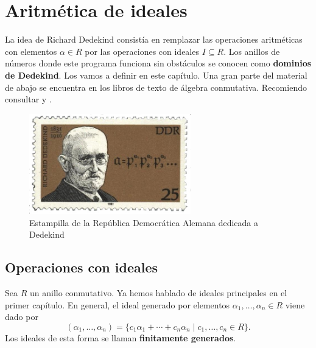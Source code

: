 \chapter{Aritmética de ideales}

La idea de Richard Dedekind consistía en remplazar las operaciones aritméticas
con elementos $\alpha \in R$ por las operaciones con ideales $I\subseteq R$.
Los anillos de números donde este programa funciona sin obstáculos se conocen
como \textbf{dominios de Dedekind}. Los vamos a definir en este capítulo.
Una gran parte del material de abajo se encuentra en los libros de texto de
álgebra conmutativa. Recomiendo consultar \cite{Atiyah-Macdonald} y
\cite{Reid-UCA}.

\begin{figure}
  \begin{center}
    \includegraphics[width=7cm]{pic/Dedekind_stamp.jpg}
  \end{center}

  \caption{Estampilla de la República Democrática Alemana dedicada a Dedekind}
\end{figure}


\section{Operaciones con ideales}


Sea $R$ un anillo conmutativo. Ya hemos hablado de ideales principales en
el primer capítulo. En general, el ideal generado por elementos
$\alpha_1,\ldots,\alpha_n \in R$ viene dado por
\[ (\alpha_1,\ldots,\alpha_n) =
   \{ c_1 \alpha_1 + \cdots + c_n \alpha_n \mid c_1,\ldots,c_n \in R \}. \]
Los ideales de esta forma se llaman \textbf{finitamente generados}.

